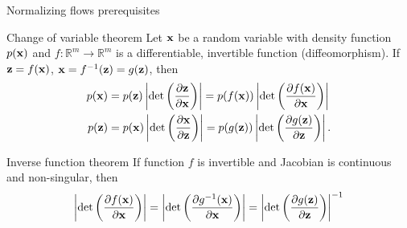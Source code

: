 \begin{frame}{Normalizing flows prerequisites}
	\begin{block}{Change of variable theorem}
		Let $\mathbf{x}$ be a random variable with density function $p(\mathbf{x})$ and $f: \mathbb{R}^m \rightarrow \mathbb{R}^m$ is a differentiable, invertible function (diffeomorphism). If $\mathbf{z} = f(\mathbf{x})$, $\mathbf{x} = f^{-1}(\mathbf{z}) = g(\mathbf{z})$, then
		\begin{align*}
			p(\mathbf{x}) &= p(\mathbf{z}) \left|\det \left(  \frac{\partial \mathbf{z}}{\partial \mathbf{x}} \right) \right| = p(f(\mathbf{x})) \left|\det \left(  \frac{\partial f(\mathbf{x})}{\partial \mathbf{x}} \right) \right| \\
			p(\mathbf{z}) &= p(\mathbf{x}) \left|\det \left(  \frac{\partial \mathbf{x}}{\partial \mathbf{z}} \right) \right| = p(g(\mathbf{z})) \left|\det \left(  \frac{\partial g(\mathbf{z})}{\partial \mathbf{z}} \right) \right|.
		\end{align*}
		\vspace{-0.5cm}
	\end{block}
	\begin{block}{Inverse function theorem}
		If function $f$ is invertible and Jacobian is continuous and non-singular, then
		\[
			\left|\det \left(  \frac{\partial f(\mathbf{x})}{\partial \mathbf{x}} \right)\right| = \left|\det \left(  \frac{\partial g^{-1}(\mathbf{x})}{\partial \mathbf{x}} \right)\right| = \left|\det \left(  \frac{\partial g(\mathbf{z})}{\partial \mathbf{z}} \right)\right|^{-1}
		\]
	\end{block}
\end{frame}
